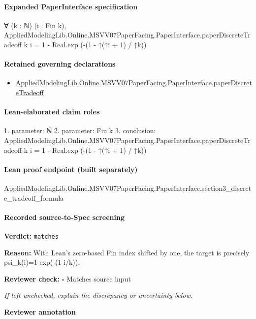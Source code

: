 \documentclass[10pt]{article}
\newcommand{\reviewerbox}{%
  \par\noindent\fbox{\parbox{0.96\linewidth}{\rule{0pt}{0.38in}}}\par
}
\newcommand{\reviewmatch}[1]{%
  \par\noindent\textbf{Reviewer check:} $\square$\; #1\par
  \noindent\emph{If left unchecked, explain the discrepancy or uncertainty below.}\par
}
\begin{document}
\paragraph{Expanded PaperInterface specification}
\begin{ReviewVerbatim}
∀ (k : ℕ) (i : Fin k),
  AppliedModelingLib.Online.MSVV07PaperFacing.PaperInterface.paperDiscreteTradeoff k i =
    1 - Real.exp (-(1 - ↑(↑i + 1) / ↑k))
\end{ReviewVerbatim}

\paragraph{Retained governing declarations}
\begin{itemize}\raggedright
\item \hyperlink{governing-declaration-396ea3a99753fcc5}{Applied\allowbreak{}Modeling\allowbreak{}Lib.\allowbreak{}Online.\allowbreak{}MSVV07\allowbreak{}Paper\allowbreak{}Facing.\allowbreak{}Paper\allowbreak{}Interface.\allowbreak{}paper\allowbreak{}Discrete\allowbreak{}Tradeoff}
\end{itemize}
\paragraph{Lean-elaborated claim roles}\begin{ReviewVerbatim}
1. parameter: ℕ
2. parameter: Fin k
3. conclusion: AppliedModelingLib.Online.MSVV07PaperFacing.PaperInterface.paperDiscreteTradeoff k i =
  1 - Real.exp (-(1 - ↑(↑i + 1) / ↑k))
\end{ReviewVerbatim}

\paragraph{Lean proof endpoint (built separately)}\begin{ReviewVerbatim}
AppliedModelingLib.Online.MSVV07PaperFacing.PaperInterface.section3_discrete_tradeoff_formula
\end{ReviewVerbatim}

\paragraph{Recorded source-to-Spec screening}
\textbf{Verdict:} \texttt{matches}
\\
{\raggedright
\textbf{Reason:} With Lean's zero-\allowbreak{}based Fin index shifted by one, the target is precisely psi\_\allowbreak{}k(i)=1-\allowbreak{}exp(-\allowbreak{}(1-\allowbreak{}i/\allowbreak{}k)).\allowbreak{}
\par}
\reviewmatch{Matches source input}
\noindent\textbf{Reviewer annotation}\par
\reviewerbox
\clearpage
\hypertarget{source-claim-b43b4f2f05935cab}{}
\end{document}

